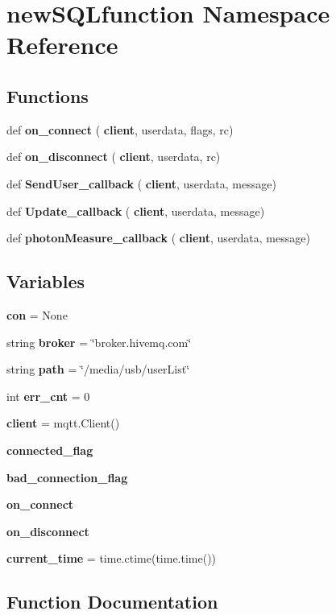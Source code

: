 \section{new\+S\+Q\+Lfunction Namespace Reference}
\label{namespacenew_s_q_lfunction}
\subsection*{Functions}
\begin{DoxyCompactItemize}
\item 
def \textbf{ on\+\_\+connect} (\textbf{ client}, userdata, flags, rc)
\item 
def \textbf{ on\+\_\+disconnect} (\textbf{ client}, userdata, rc)
\item 
def \textbf{ Send\+User\+\_\+callback} (\textbf{ client}, userdata, message)
\item 
def \textbf{ Update\+\_\+callback} (\textbf{ client}, userdata, message)
\item 
def \textbf{ photon\+Measure\+\_\+callback} (\textbf{ client}, userdata, message)
\end{DoxyCompactItemize}
\subsection*{Variables}
\begin{DoxyCompactItemize}
\item 
\textbf{ con} = None
\item 
string \textbf{ broker} = \char`\"{}broker.\+hivemq.\+com\char`\"{}
\item 
string \textbf{ path} = \char`\"{}/media/usb/user\+List\char`\"{}
\item 
int \textbf{ err\+\_\+cnt} = 0
\item 
\textbf{ client} = mqtt.\+Client()
\item 
\textbf{ connected\+\_\+flag}
\item 
\textbf{ bad\+\_\+connection\+\_\+flag}
\item 
\textbf{ on\+\_\+connect}
\item 
\textbf{ on\+\_\+disconnect}
\item 
\textbf{ current\+\_\+time} = time.\+ctime(time.\+time())
\end{DoxyCompactItemize}


\subsection{Function Documentation}
\mbox{\label{namespacenew_s_q_lfunction_aaded697e62b5f212c4a23aa73861e93d}} 
